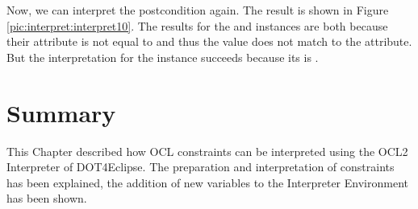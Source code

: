 Now, we can interpret the postcondition again. The result is shown in Figure \ref{pic:interpret:interpret10}. The results for the  and  instances are both  because their  attribute is not equal to  and thus the  value does not match to the  attribute. But the interpretation for the  instance succeeds because its  is .




\section{Summary}
  
This Chapter described how \acs{OCL} constraints can be interpreted using the \acs{OCL}2 Interpreter of \acl{DOT4Eclipse}. The preparation and interpretation of constraints has been explained, the addition of new variables to the Interpreter Environment has been shown.